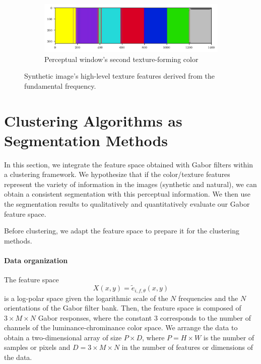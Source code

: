 \documentclass[journal]{IEEEtran}
\begin{document}
\begin{figure}[!ht]
\begin{subfigure}[b]{0.5\textwidth}
    \end{subfigure}\\
    \begin{subfigure}[b]{0.5\textwidth}
    	\includegraphics[width=\textwidth]{perceptual_color2_synth}
        \caption{Perceptual window's second texture-forming color}
        \label{fig:perceptual_color2_synth}
    \end{subfigure}    
                  
    \caption{Synthetic image's high-level texture features derived from the fundamental frequency.}\label{fig:colors_high_level_features_synth}    
\end{figure}


\section{Clustering Algorithms as Segmentation Methods}

In this section, we integrate the feature space obtained with Gabor filters within a clustering framework. We hypothesize that if the color/texture features represent the variety of information in the images (synthetic and natural), we can obtain a consistent segmentation with this perceptual information. We then use the segmentation results to qualitatively and quantitatively evaluate our Gabor feature space.

Before clustering, we adapt the feature space to prepare it for the clustering methods.

\paragraph{Data organization}
The feature space 
\begin{equation}\label{eq:feature_space_clustering}
	X(x,y) = \widetilde{e}_{i, f, \theta}(x,y)
\end{equation}
is a log-polar space given the logarithmic scale of the $N$ frequencies and the $N$ orientations of the Gabor filter bank. Then, the feature space is composed of $3 \times M \times N$ Gabor responses, where the constant $3$ corresponds to the number of channels of the luminance-chrominance color space. We arrange the data to obtain a two-dimensional array of size $P \times D$, where $P= H\times W$  is the number of samples or pixels and $D =3 \times M \times N$ in the number of features or dimensions of the data.
\end{document}
